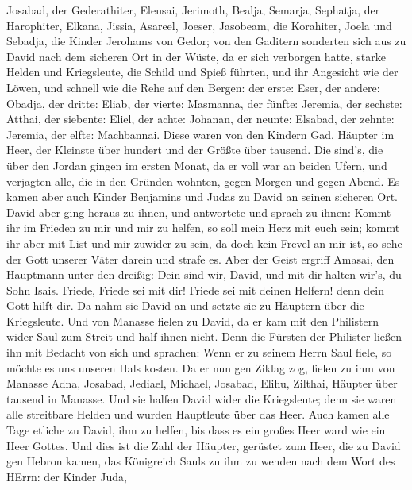 Josabad, der Gederathiter,  Eleusai, Jerimoth, Bealja,
Semarja, Sephatja, der Harophiter,  Elkana, Jissia, Asareel,
Joeser, Jasobeam, die Korahiter,  Joela und Sebadja, die
Kinder Jerohams von Gedor;  von den Gaditern sonderten sich
aus zu David nach dem sicheren Ort in der Wüste, da er sich verborgen
hatte, starke Helden und Kriegsleute, die Schild und Spieß führten, und
ihr Angesicht wie der Löwen, und schnell wie die Rehe auf den Bergen:
 der erste: Eser, der andere: Obadja, der dritte: Eliab,
 der vierte: Masmanna, der fünfte: Jeremia, 
der sechste: Atthai, der siebente: Eliel,  der achte:
Johanan, der neunte: Elsabad,  der zehnte: Jeremia, der
elfte: Machbannai.  Diese waren von den Kindern Gad,
Häupter im Heer, der Kleinste über hundert und der Größte über tausend.
 Die sind's, die über den Jordan gingen im ersten Monat, da
er voll war an beiden Ufern, und verjagten alle, die in den Gründen
wohnten, gegen Morgen und gegen Abend.  Es kamen aber auch
Kinder Benjamins und Judas zu David an seinen sicheren Ort.
 David aber ging heraus zu ihnen, und antwortete und sprach
zu ihnen: Kommt ihr im Frieden zu mir und mir zu helfen, so soll mein
Herz mit euch sein; kommt ihr aber mit List und mir zuwider zu sein, da
doch kein Frevel an mir ist, so sehe der Gott unserer Väter darein und
strafe es.  Aber der Geist ergriff Amasai, den Hauptmann
unter den dreißig: Dein sind wir, David, und mit dir halten wir's, du
Sohn Isais. Friede, Friede sei mit dir! Friede sei mit deinen Helfern!
denn dein Gott hilft dir. Da nahm sie David an und setzte sie zu
Häuptern über die Kriegsleute.  Und von Manasse fielen zu
David, da er kam mit den Philistern wider Saul zum Streit und half ihnen
nicht. Denn die Fürsten der Philister ließen ihn mit Bedacht von sich
und sprachen: Wenn er zu seinem Herrn Saul fiele, so möchte es uns
unseren Hals kosten.  Da er nun gen Ziklag zog, fielen zu
ihm von Manasse Adna, Josabad, Jediael, Michael, Josabad, Elihu,
Zilthai, Häupter über tausend in Manasse.  Und sie halfen
David wider die Kriegsleute; denn sie waren alle streitbare Helden und
wurden Hauptleute über das Heer.  Auch kamen alle Tage
etliche zu David, ihm zu helfen, bis dass es ein großes Heer ward wie
ein Heer Gottes.  Und dies ist die Zahl der Häupter,
gerüstet zum Heer, die zu David gen Hebron kamen, das Königreich Sauls
zu ihm zu wenden nach dem Wort des HErrn:  der Kinder Juda,
